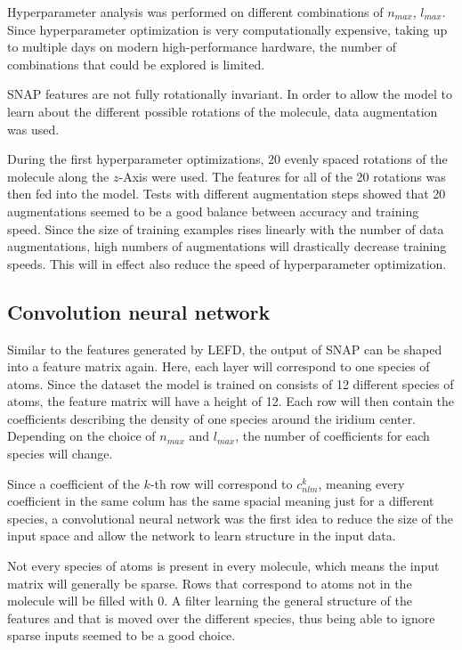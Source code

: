Hyperparameter analysis was performed on different combinations of $n_{max}$, $l_{max}$.
Since hyperparameter optimization is very computationally expensive, taking up to multiple days on modern high-performance hardware,
the number of combinations that could be explored is limited.

SNAP features are not fully rotationally invariant.
In order to allow the model to learn about the different possible rotations of the molecule, data augmentation was used.

During the first hyperparameter optimizations, 20 evenly spaced rotations of the molecule along the $z$-Axis were used.
The features for all of the 20 rotations was then fed into the model.
Tests with different augmentation steps showed that 20 augmentations seemed to be a good balance between 
accuracy and training speed.
Since the size of training examples rises linearly with the number of data augmentations,
high numbers of augmentations will drastically decrease training speeds.
This will in effect also reduce the speed of hyperparameter optimization.

\subsection{Convolution neural network}

Similar to the features generated by LEFD, the output of SNAP can be shaped into a feature matrix again.
Here, each layer will correspond to one species of atoms.
Since the dataset the model is trained on consists of 12 different species of atoms, the feature matrix will have a height of 12.
Each row will then contain the coefficients describing the density of one species around the iridium center.
Depending on the choice of $n_{max}$ and $l_{max}$, the number of coefficients for each species will change.

Since a coefficient of the $k$-th row will correspond to $c^k_{nlm}$, meaning every coefficient in the same colum has the same spacial meaning just for a different species,
a convolutional neural network was the first idea to reduce the size of the input space and allow the network to learn structure in the input data.

Not every species of atoms is present in every molecule, which means the input matrix will generally be sparse.
Rows that correspond to atoms not in the molecule will be filled with 0.
A filter learning the general structure of the features and that is moved over the different species, thus
being able to ignore sparse inputs seemed to be a good choice.

